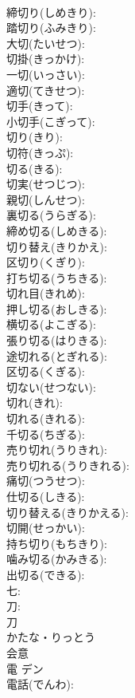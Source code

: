 \documentclass[8pt]{extreport}
\begin{document}
\begin{CJK}{UTF8}{min}
\\	締切り(しめきり): 
\\	踏切り(ふみきり): 
\\	大切(たいせつ): 
\\	切掛(きっかけ): 
\\	一切(いっさい): 
\\	適切(てきせつ): 
\\	切手(きって): 
\\	小切手(こぎって): 
\\	切り(きり): 
\\	切符(きっぷ): 
\\	切る(きる): 
\\	切実(せつじつ): 
\\	親切(しんせつ): 
\\	裏切る(うらぎる): 
\\	締め切る(しめきる): 
\\	切り替え(きりかえ): 
\\	区切り(くぎり): 
\\	打ち切る(うちきる): 
\\	切れ目(きれめ): 
\\	押し切る(おしきる): 
\\	横切る(よこぎる): 
\\	張り切る(はりきる): 
\\	途切れる(とぎれる): 
\\	区切る(くぎる): 
\\	切ない(せつない): 
\\	切れ(きれ): 
\\	切れる(きれる): 
\\	千切る(ちぎる): 
\\	売り切れ(うりきれ): 
\\	売り切れる(うりきれる): 
\\	痛切(つうせつ): 
\\	仕切る(しきる): 
\\	切り替える(きりかえる): 
\\	切開(せっかい): 
\\	持ち切り(もちきり): 
\\	噛み切る(かみきる): 
\\	出切る(できる): 
\\	七: 
\\	刀: 
\\	刀	
\\	かたな・りっとう	
\\	会意 
\\	電	デン			
\\	電話(でんわ): 

\end{CJK}
\end{document}
